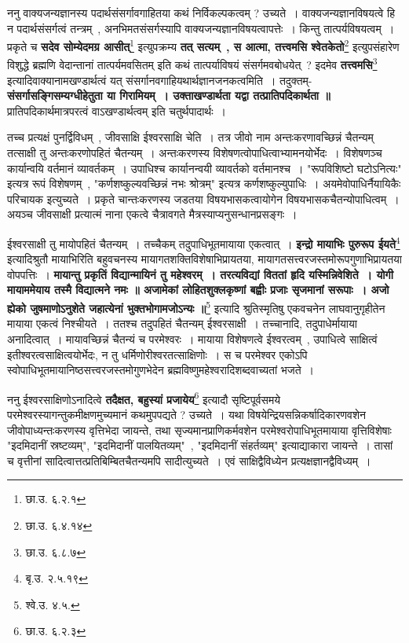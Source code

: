 	ननु वाक्यजन्यज्ञानस्य पदार्थसंसर्गावगाहितया कथं निर्विकल्पकत्वम् ? उच्यते~। वाक्यजन्यज्ञानविषयत्वे हि न पदार्थसंसर्गत्वं तन्त्रम्~, अनभिमतसंसर्गस्यापि वाक्यजन्यज्ञानविषयत्वापत्तेः~। किन्तु तात्पर्यविषयत्वम्~। प्रकृते च {\bfseries सदेव सोम्येदमग्र आसीत्}\footnote{छा.उ. ६.२.१} इत्युपक्रम्य {\bfseries तत् सत्यम्~, स आत्मा, तत्त्वमसि श्वेतकेतो}\footnote{छा.उ. ६.४.१४} इत्युपसंहारेण विशुद्धे ब्रह्मणि वेदान्तानां तात्पर्यमवसितम् इति कथं तात्पर्याविषयं संसर्गमवबोधयेत्~? इदमेव {\bfseries तत्त्वमसि}\footnote{छा.उ. ६.८.७} इत्यादिवाक्यानामखण्डार्थत्वं यत् संसर्गानवगाहियथार्थज्ञानजनकत्वमिति~। तदुक्तम्- {\bfseries संसर्गासङ्गिसम्यग्धीहेतुता या गिरामियम्~। उक्ताखण्डार्थता यद्वा तत्प्रातिपदिकार्थता ॥} प्रातिपदिकार्थमात्रपरत्वं वाऽखण्डार्थत्वम् इति चतुर्थपादार्थः~।\par
	तच्च प्रत्यक्षं पुनर्द्विविधम्~, जीवसाक्षि ईश्वरसाक्षि चेति~। तत्र जीवो नाम अन्तःकरणावच्छिन्नं चैतन्यम् तत्साक्षी तु अन्तःकरणोपहितं चैतन्यम्~। अन्तःकरणस्य विशेषणत्वोपाधित्वाभ्यामनयोर्भेदः~। विशेषणञ्च कार्यान्वयि वर्तमानं व्यावर्तकम्~। उपाधिश्च कार्यानन्वयी व्यावर्तको वर्तमानश्च~। "रूपविशिष्टो घटोऽनित्यः" इत्यत्र रूपं विशेषणम्~, "कर्णशष्कुल्यवच्छिन्नं नभः श्रोत्रम्" इत्यत्र कर्णशष्कुल्युपाधिः~। अयमेवोपाधिर्नैयायिकैः परिचायक इत्युच्यते~। प्रकृते चान्तःकरणस्य जडतया विषयभासकत्वायोगेन विषयभासकचैतन्योपाधित्वम्~। अयञ्च जीवसाक्षी प्रत्यात्मं नाना एकत्वे चैत्रावगते मैत्रस्याप्यनुसन्धानप्रसङ्गः~। \par
	ईश्वरसाक्षी तु मायोपहितं चैतन्यम्~। तच्चैकम् तदुपाधिभूतमायाया एकत्वात्~। {\bfseries इन्द्रो मायाभिः पुरुरूप ईयते}\footnote{बृ.उ. २.५.१९} इत्यादिश्रुतौ मायाभिरिति बहुवचनस्य मायागतशक्तिविशेषाभिप्रायतया, मायागतसत्त्वरजस्तमोरूपगुणाभिप्रायतया वोपपत्तिः~। {\bfseries मायान्तु प्रकृतिं विद्यान्मायिनं तु महेश्वरम्~। तरत्यविद्यां विततां हृदि यस्मिन्निवेशिते~। योगी मायाममेयाय तस्मै विद्यात्मने नमः ॥ अजामेकां लोहितशुक्लकृष्णां बह्वीः प्रजाः सृजमानां सरूपाः~। अजो ह्येको जुषमाणोऽनुशेते जहात्येनां भुक्तभोगामजोऽन्यः ॥}\footnote{श्वे.उ. ४.५.} इत्यादि श्रुतिस्मृतिषु एकवचनेन लाघवानुगृहीतेन मायाया एकत्वं निश्चीयते~। ततश्च तदुपहितं चैतन्यम् ईश्वरसाक्षी~। तच्चानादि, तदुपाधेर्मायाया अनादित्वात्~। मायावच्छिन्नं चैतन्यं च परमेश्वरः~। मायाया विशेषणत्वे ईश्वरत्वम्~, उपाधित्वे साक्षित्वं इतीश्वरत्वसाक्षित्वयोर्भेदः, न तु धर्मिणोरीश्वरतत्साक्षिणोः~। स च परमेश्वर एकोऽपि स्वोपाधिभूतमायानिष्ठसत्त्वरजस्तमोगुणभेदेन ब्रह्मविष्णुमहेश्वरादिशब्दवाच्यतां भजते~। \par
	ननु ईश्वरसाक्षिणोऽनादित्वे {\bfseries तदैक्षत, बहुस्यां प्रजायेय}\footnote{छा.उ. ६.२.३} इत्यादौ सृष्टिपूर्वसमये परमेश्वरस्यागन्तुकमीक्षणमुच्यमानं कथमुपपद्यते ? उच्यते~। यथा विषयेन्द्रियसन्निकर्षादिकारणवशेन जीवोपाध्यन्तःकरणस्य वृत्तिभेदा जायन्ते, तथा सृज्यमानप्राणिकर्मवशेन परमेश्वरोपाधिभूतमायाया वृत्तिविशेषाः "इदमिदानीं स्रष्टव्यम्", "इदमिदानीं पालयितव्यम्"~, "इदमिदानीं संहर्तव्यम्" इत्याद्याकारा जायन्ते~। तासां च वृत्तीनां सादित्वात्तत्प्रतिबिम्बितचैतन्यमपि सादीत्युच्यते~। एवं साक्षिद्वैविध्येन प्रत्यक्षज्ञानद्वैविध्यम्~। \par
